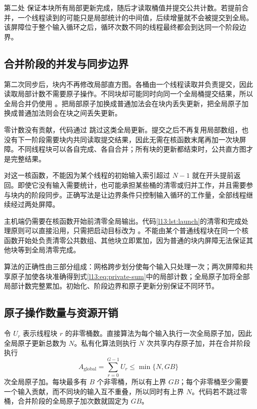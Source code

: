 第二处 \mbox{} 保证本块所有局部更新完成，随后才读取桶值并提交公共计数。若提前合并，一个线程读到的可能只是局部统计的中间值，后续增量就不会被提交到全局。该屏障位于整个输入循环之后，循环次数不同的线程最终都会到达同一个阶段边界。

\subsection{合并阶段的并发与同步边界}

第二次同步后，块内不再修改局部直方图。各桶由一个线程读取并负责提交，因此读取局部计数不需要原子操作。不同块却可能同时向同一个全局桶提交结果，所以全局合并仍使用 \mbox{}。把局部原子加换成普通加法会在块内丢失更新，把全局原子加换成普通加法则会在块之间丢失更新。

零计数没有贡献，代码通过 \mbox{} 跳过这类全局更新。提交之后不再复用局部数组，也没有下一阶段需要块内共同读取提交结果，因此无需在核函数末尾再加一次块屏障。不同线程块可以各自完成、各自合并；所有块的更新都结束时，公共直方图才是完整结果。

对这一核函数，不能因为某个线程的初始输入索引超过 $N-1$ 就在开头提前返回。即使它没有输入需要统计，也可能承担某些桶的清零或归并工作，并且需要参与块内的阶段同步。正确写法是让边界条件只控制输入循环的工作量，全部线程继续经过两处屏障。

主机端仍需要在核函数开始前清零全局输出。代码\ref{l13:lst:launch}的清零和完成处理原则可以直接沿用，只需把启动目标改为 \mbox{}。不能由某个普通线程块在同一个核函数开始处负责清零公共数组、其他块立即累加，因为普通的块内屏障无法保证其他块等到全局清零完成。

算法的正确性由三部分组成：网格跨步划分使每个输入只处理一次；两次屏障和共享原子加使各块准确得到式\eqref{l13:eq:private-sum}中的局部计数；全局原子加将全部局部计数完整累加。初始化、阶段边界和原子更新分别保证不同环节。

\subsection{原子操作数量与资源开销}

令 $U_r$ 表示线程块 $r$ 的非零桶数。直接算法为每个输入执行一次全局原子加，因此全局原子更新总数为 $N$。私有化算法则执行 $N$ 次共享内存原子加，并在合并阶段执行
\begin{equation}
A_{\mathrm{global}}=\sum_{r=0}^{G-1}U_r
\le\min\{N,GB\}
\label{l13:eq:merge-count}
\end{equation}
次全局原子加。每块最多有 $B$ 个非零桶，所以有上界 $GB$；每个非零桶至少需要一个输入贡献，而不同块的输入互不重叠，所以同时有上界 $N$。代码若不跳过零桶，合并阶段的全局原子加次数就固定为 $GB$。

